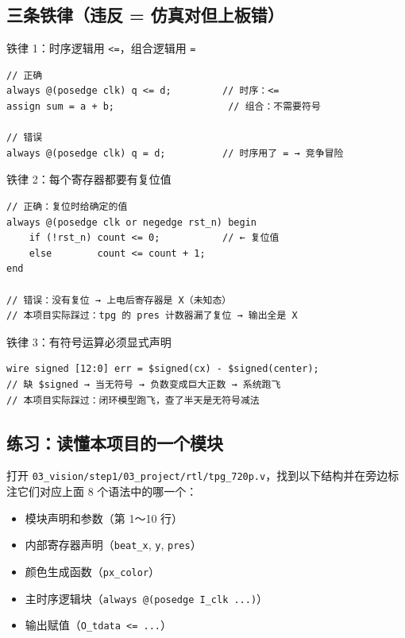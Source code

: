 \documentclass[11pt]{ctexart}
\begin{document}
\subsection{三条铁律（违反 = 仿真对但上板错）}

\begin{warnbox}{铁律 1：时序逻辑用 \texttt{<=}，组合逻辑用 \texttt{=}}
\begin{Verbatim}[fontsize=\small]
// 正确
always @(posedge clk) q <= d;         // 时序：<=
assign sum = a + b;                    // 组合：不需要符号

// 错误
always @(posedge clk) q = d;          // 时序用了 = → 竞争冒险
\end{Verbatim}
\end{warnbox}

\begin{warnbox}{铁律 2：每个寄存器都要有复位值}
\begin{Verbatim}[fontsize=\small]
// 正确：复位时给确定的值
always @(posedge clk or negedge rst_n) begin
    if (!rst_n) count <= 0;           // ← 复位值
    else        count <= count + 1;
end

// 错误：没有复位 → 上电后寄存器是 X（未知态）
// 本项目实际踩过：tpg 的 pres 计数器漏了复位 → 输出全是 X
\end{Verbatim}
\end{warnbox}

\begin{warnbox}{铁律 3：有符号运算必须显式声明}
\begin{Verbatim}[fontsize=\small]
wire signed [12:0] err = $signed(cx) - $signed(center);
// 缺 $signed → 当无符号 → 负数变成巨大正数 → 系统跑飞
// 本项目实际踩过：闭环模型跑飞，查了半天是无符号减法
\end{Verbatim}
\end{warnbox}

\subsection{练习：读懂本项目的一个模块}

打开 \texttt{03\_vision/step1/03\_project/rtl/tpg\_720p.v}，找到以下结构并在旁边标注它们对应上面 8 个语法中的哪一个：

\begin{itemize}
  \item 模块声明和参数（第 1～10 行）
  \item 内部寄存器声明（\texttt{beat\_x}, \texttt{y}, \texttt{pres}）
  \item 颜色生成函数（\texttt{px\_color}）
  \item 主时序逻辑块（\texttt{always @(posedge I\_clk ...)}）
  \item 输出赋值（\texttt{O\_tdata <= ...}）
\end{itemize}
\end{document}
